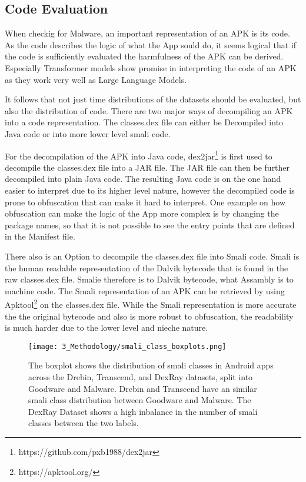 \newpage

\subsection{Code Evaluation}

When checkig for Malware, an important representation of an APK is its code.
As the code describes the logic of what the App sould do, it seems logical that if the code is sufficiently evaluated the harmfulness of the APK can be derived.
Especially Transformer models show promise in interpreting the code of an APK as they work very well as Large Language Models.

It follows that not just time distributions of the datasets should be evaluated, but also the distribution of code.
There are two major ways of decompiling an APK into a code representation.
The classes.dex file can either be Decompiled into Java code or into more lower level smali code.

For the decompilation of the APK into Java code, dex2jar\footnote{https://github.com/pxb1988/dex2jar} is first used to decompile the classes.dex file into a JAR file.
The JAR file can then be further decompiled into plain Java code. 
The resulting Java code is on the one hand easier to interpret due to its higher level nature, however the decompiled code is prone to obfuscation that can make it hard to interpret.
One example on how obfuscation can make the logic of the App more complex is by changing the package names, so that it is not possible to see the entry points that are defined in the Manifest file.

There also is an Option to decompile the classes.dex file into Smali code.
Smali is the human readable representation of the Dalvik bytecode that is found in the raw classes.dex file.
Smalie therefore is to Dalvik bytecode, what Assambly is to machine code.
The Smali representation of an APK can be retrieved by using Apktool\footnote{https://apktool.org/} on the classes.dex file.
While the Smali representation is more accurate the the original bytecode and also is more robust to obfuscation, the readability is much harder due to the lower level and nieche nature. 


\begin{figure*}[b!]
    \centering
    \begin{minipage}{1.5\textwidth}
        \centering
        \texttt{[image: 3\_Methodology/smali\_class\_boxplots.png]}
        \captionsetup{width=\textwidth}
        \caption{\label{fig:smali_class_boxplots}
        The boxplot shows the distribution of smali classes in Android apps 
        across the Drebin, Transcend, and DexRay datasets, 
        split into Goodware and Malware. 
        Drebin and Transcend have an similar smali class distribution 
        between Goodware and Malware.
        The DexRay Dataset shows a high inbalance in the number of smali classes 
        between the two labels.
        }
    \end{minipage}
\end{figure*}

